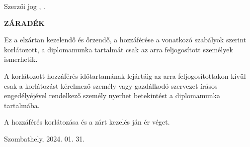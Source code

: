 \selecthungarian
\begin{flushleft}
Szerzői jog {\textcopyright} \authorName, \the\year.
\end{flushleft}

\vspace{0.5cm}

\begin{center}
\textbf{ZÁRADÉK}\\
\end{center}

\vspace{0.5cm}
\noindent
Ez a \MakeLowercase{\munkatipusHU} elzártan kezelendő és őrzendő, a hozzáférése a vonatkozó szabályok szerint korlátozott, a diplomamunka tartalmát csak az arra feljogosított személyek ismerhetik.

A korlátozott hozzáférés időtartamának lejártáig az arra feljogosítottakon kívül csak a korlátozást kérelmező személy vagy gazdálkodó szervezet írásos engedélyéjével rendelkező személy nyerhet betekintést a diplomamunka tartalmába.

\vspace{0.3cm}

A hozzáférés korlátozása és a zárt kezelés \endOfRestrictedAccess ján ér véget.

\vspace{30pt}
\noindent Szombathely, 2024. 01. 31.
\vfill
\clearpage
\thispagestyle{empty} %

\selectthesislanguage
